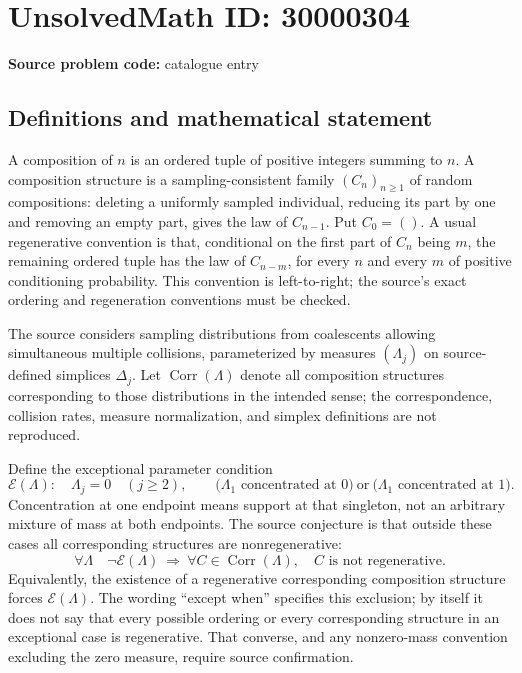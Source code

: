 \documentclass[11pt]{article}
\begin{document}
\section*{UnsolvedMath ID: 30000304}
\textbf{Source problem code:} catalogue entry
\subsection{Definitions and mathematical statement}
A composition of \(n\) is an ordered tuple of positive integers summing to \(n\). A composition structure is a sampling-consistent family \((C_n)_{n\geq1}\) of random compositions: deleting a uniformly sampled individual, reducing its part by one and removing an empty part, gives the law of \(C_{n-1}\). Put \(C_0=()\). A usual regenerative convention is that, conditional on the first part of \(C_n\) being \(m\), the remaining ordered tuple has the law of \(C_{n-m}\), for every \(n\) and every \(m\) of positive conditioning probability. This convention is left-to-right; the source's exact ordering and regeneration conventions must be checked.

The source considers sampling distributions from coalescents allowing simultaneous multiple collisions, parameterized by measures \((\Lambda_j)\) on source-defined simplices \(\Delta_j\). Let \(\operatorname{Corr}(\Lambda)\) denote all composition structures corresponding to those distributions in the intended sense; the correspondence, collision rates, measure normalization, and simplex definitions are not reproduced.

Define the exceptional parameter condition
\[
\mathcal E(\Lambda):\quad
\Lambda_j=0\quad(j\geq2),\qquad
\bigl(\Lambda_1\text{ concentrated at }0\bigr)
\ \text{or}\ 
\bigl(\Lambda_1\text{ concentrated at }1\bigr).
\]
Concentration at one endpoint means support at that singleton, not an arbitrary mixture of mass at both endpoints. The source conjecture is that outside these cases all corresponding structures are nonregenerative:
\[
\forall\Lambda\quad\neg\mathcal E(\Lambda)
\ \Longrightarrow\ 
\forall C\in\operatorname{Corr}(\Lambda),\quad C\text{ is not regenerative}.
\]
Equivalently, the existence of a regenerative corresponding composition structure forces \(\mathcal E(\Lambda)\). The wording ``except when'' specifies this exclusion; by itself it does not say that every possible ordering or every corresponding structure in an exceptional case is regenerative. That converse, and any nonzero-mass convention excluding the zero measure, require source confirmation.
\end{document}
